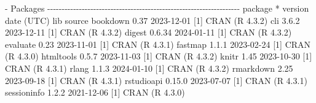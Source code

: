 \documentclass[
  10pt,
  a4paper,
]{book}
\newenvironment{Shaded}{\begin{snugshade}}{\end{snugshade}}
\newcommand{\DecValTok}[1]{\textcolor[rgb]{0.68,0.00,0.00}{#1}}
\newcommand{\FloatTok}[1]{\textcolor[rgb]{0.68,0.00,0.00}{#1}}
\newcommand{\FunctionTok}[1]{\textcolor[rgb]{0.28,0.35,0.67}{#1}}
\newcommand{\NormalTok}[1]{\textcolor[rgb]{0.00,0.46,0.62}{#1}}
\newcommand{\SpecialCharTok}[1]{\textcolor[rgb]{0.37,0.37,0.37}{#1}}
\begin{document}
\begin{Shaded}
\begin{Highlighting}[]
\SpecialCharTok{{-}}\NormalTok{ Packages }\SpecialCharTok{{-}{-}{-}{-}{-}{-}{-}{-}{-}{-}{-}{-}{-}{-}{-}{-}{-}{-}{-}{-}{-}{-}{-}{-}{-}{-}{-}{-}{-}{-}{-}{-}{-}{-}{-}{-}{-}{-}{-}{-}{-}{-}{-}{-}{-}{-}{-}{-}{-}{-}{-}{-}{-}{-}{-}{-}{-}{-}{-}{-}{-}{-}{-}{-}{-}{-}{-}}
\NormalTok{ package       }\SpecialCharTok{*}\NormalTok{ version }\FunctionTok{date}\NormalTok{ (UTC) lib source}
\NormalTok{ bookdown        }\FloatTok{0.37}    \DecValTok{2023{-}12{-}01}\NormalTok{ [}\DecValTok{1}\NormalTok{] }\FunctionTok{CRAN}\NormalTok{ (R }\DecValTok{4}\NormalTok{.}\FloatTok{3.2}\NormalTok{)}
\NormalTok{ cli             }\DecValTok{3}\NormalTok{.}\FloatTok{6.2}   \DecValTok{2023{-}12{-}11}\NormalTok{ [}\DecValTok{1}\NormalTok{] }\FunctionTok{CRAN}\NormalTok{ (R }\DecValTok{4}\NormalTok{.}\FloatTok{3.2}\NormalTok{)}
\NormalTok{ digest          }\DecValTok{0}\NormalTok{.}\FloatTok{6.34}  \DecValTok{2024{-}01{-}11}\NormalTok{ [}\DecValTok{1}\NormalTok{] }\FunctionTok{CRAN}\NormalTok{ (R }\DecValTok{4}\NormalTok{.}\FloatTok{3.2}\NormalTok{)}
\NormalTok{ evaluate        }\FloatTok{0.23}    \DecValTok{2023{-}11{-}01}\NormalTok{ [}\DecValTok{1}\NormalTok{] }\FunctionTok{CRAN}\NormalTok{ (R }\DecValTok{4}\NormalTok{.}\FloatTok{3.1}\NormalTok{)}
\NormalTok{ fastmap         }\DecValTok{1}\NormalTok{.}\FloatTok{1.1}   \DecValTok{2023{-}02{-}24}\NormalTok{ [}\DecValTok{1}\NormalTok{] }\FunctionTok{CRAN}\NormalTok{ (R }\DecValTok{4}\NormalTok{.}\FloatTok{3.0}\NormalTok{)}
\NormalTok{ htmltools       }\DecValTok{0}\NormalTok{.}\FloatTok{5.7}   \DecValTok{2023{-}11{-}03}\NormalTok{ [}\DecValTok{1}\NormalTok{] }\FunctionTok{CRAN}\NormalTok{ (R }\DecValTok{4}\NormalTok{.}\FloatTok{3.2}\NormalTok{)}
\NormalTok{ knitr           }\FloatTok{1.45}    \DecValTok{2023{-}10{-}30}\NormalTok{ [}\DecValTok{1}\NormalTok{] }\FunctionTok{CRAN}\NormalTok{ (R }\DecValTok{4}\NormalTok{.}\FloatTok{3.1}\NormalTok{)}
\NormalTok{ rlang           }\DecValTok{1}\NormalTok{.}\FloatTok{1.3}   \DecValTok{2024{-}01{-}10}\NormalTok{ [}\DecValTok{1}\NormalTok{] }\FunctionTok{CRAN}\NormalTok{ (R }\DecValTok{4}\NormalTok{.}\FloatTok{3.2}\NormalTok{)}
\NormalTok{ rmarkdown       }\FloatTok{2.25}    \DecValTok{2023{-}09{-}18}\NormalTok{ [}\DecValTok{1}\NormalTok{] }\FunctionTok{CRAN}\NormalTok{ (R }\DecValTok{4}\NormalTok{.}\FloatTok{3.1}\NormalTok{)}
\NormalTok{ rstudioapi      }\DecValTok{0}\NormalTok{.}\FloatTok{15.0}  \DecValTok{2023{-}07{-}07}\NormalTok{ [}\DecValTok{1}\NormalTok{] }\FunctionTok{CRAN}\NormalTok{ (R }\DecValTok{4}\NormalTok{.}\FloatTok{3.1}\NormalTok{)}
\NormalTok{ sessioninfo     }\DecValTok{1}\NormalTok{.}\FloatTok{2.2}   \DecValTok{2021{-}12{-}06}\NormalTok{ [}\DecValTok{1}\NormalTok{] }\FunctionTok{CRAN}\NormalTok{ (R }\DecValTok{4}\NormalTok{.}\FloatTok{3.0}\NormalTok{)}

\end{Highlighting}
\end{Shaded}
\end{document}
